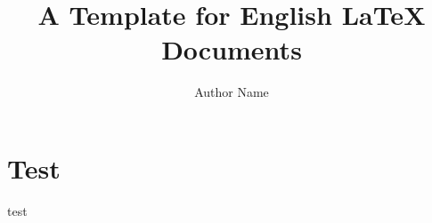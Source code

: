 \documentclass[a4paper]{article}
\title{A Template for English LaTeX Documents}
\author{Author Name}
\begin{document}
\maketitle

\section{Test}
test



\end{document}
